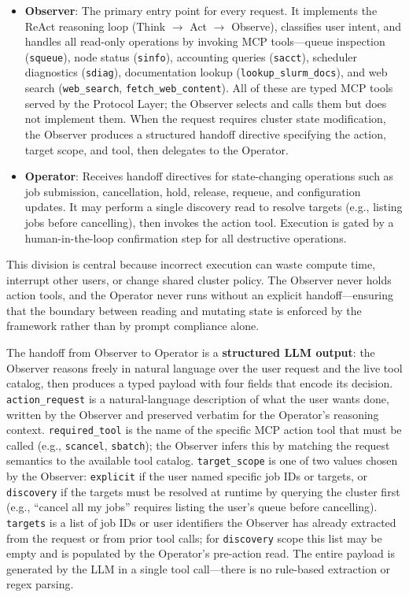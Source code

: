 \begin{itemize}
    \item \textbf{Observer}: The primary entry point for every request. It implements the ReAct reasoning loop (Think $\rightarrow$ Act $\rightarrow$ Observe), classifies user intent, and handles all read-only operations by invoking MCP tools---queue inspection (\texttt{squeue}), node status (\texttt{sinfo}), accounting queries (\texttt{sacct}), scheduler diagnostics (\texttt{sdiag}), documentation lookup (\texttt{lookup\_slurm\_docs}), and web search (\texttt{web\_search}, \texttt{fetch\_web\_content}). All of these are typed MCP tools served by the Protocol Layer; the Observer selects and calls them but does not implement them. When the request requires cluster state modification, the Observer produces a structured handoff directive specifying the action, target scope, and tool, then delegates to the Operator.
    
    \item \textbf{Operator}: Receives handoff directives for state-changing operations such as job submission, cancellation, hold, release, requeue, and configuration updates. It may perform a single discovery read to resolve targets (e.g., listing jobs before cancelling), then invokes the action tool. Execution is gated by a human-in-the-loop confirmation step for all destructive operations.
\end{itemize}

This division is central because incorrect execution can waste compute time, interrupt other users, or change shared cluster policy. The Observer never holds action tools, and the Operator never runs without an explicit handoff---ensuring that the boundary between reading and mutating state is enforced by the framework rather than by prompt compliance alone.

The handoff from Observer to Operator is a \textbf{structured LLM output}: the Observer reasons freely in natural language over the user request and the live tool catalog, then produces a typed payload with four fields that encode its decision. \texttt{action\_request} is a natural-language description of what the user wants done, written by the Observer and preserved verbatim for the Operator's reasoning context. \texttt{required\_tool} is the name of the specific MCP action tool that must be called (e.g., \texttt{scancel}, \texttt{sbatch}); the Observer infers this by matching the request semantics to the available tool catalog. \texttt{target\_scope} is one of two values chosen by the Observer: \texttt{explicit} if the user named specific job IDs or targets, or \texttt{discovery} if the targets must be resolved at runtime by querying the cluster first (e.g., ``cancel all my jobs'' requires listing the user's queue before cancelling). \texttt{targets} is a list of job IDs or user identifiers the Observer has already extracted from the request or from prior tool calls; for \texttt{discovery} scope this list may be empty and is populated by the Operator's pre-action read. The entire payload is generated by the LLM in a single tool call---there is no rule-based extraction or regex parsing.

